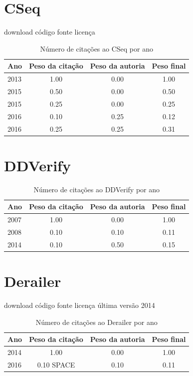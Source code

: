 \section{CSeq}
\checkmark download
\checkmark código fonte
\checkmark licença
\begin{table}[H]
\caption{Número de citações ao CSeq por ano}
\centering
\begin{tabular}{| l | c | c | c |}
  \hline
  Ano & Peso da citação & Peso da autoria & Peso final \\
  \hline
  2013
    & 1.00
    & 0.00
    & {\color{blue} 1.00} \\
\hline
  2015
    & 0.50
    & 0.00
    & {\color{blue} 0.50} \\
  2015
    & 0.25
    & 0.00
    & {\color{red} 0.25} \\
\hline
  2016
    & 0.10
    & 0.25
    & {\color{red} 0.12} \\
  2016
    & 0.25
    & 0.25
    & {\color{red} 0.31} \\
\hline
\end{tabular}
\end{table}
\section{DDVerify}
\begin{table}[H]
\caption{Número de citações ao DDVerify por ano}
\centering
\begin{tabular}{| l | c | c | c |}
  \hline
  Ano & Peso da citação & Peso da autoria & Peso final \\
  \hline
  2007
    & 1.00
    & 0.00
    & {\color{blue} 1.00} \\
\hline
  2008
    & 0.10
    & 0.10
    & {\color{red} 0.11} \\
\hline
  2014
    & 0.10
    & 0.50
    & {\color{red} 0.15} \\
\hline
\end{tabular}
\end{table}
\section{Derailer}
\checkmark download
\checkmark código fonte
\checkmark licença
\checkmark última versão 2014
\begin{table}[H]
\caption{Número de citações ao Derailer por ano}
\centering
\begin{tabular}{| l | c | c | c |}
  \hline
  Ano & Peso da citação & Peso da autoria & Peso final \\
  \hline
  2014
    & 1.00
    & 0.00
    & {\color{blue} 1.00} \\
\hline
  2016
    & 0.10
          {\tiny SPACE}
    & 0.10
    & {\color{red} 0.11} \\
\hline
\end{tabular}
\end{table}
